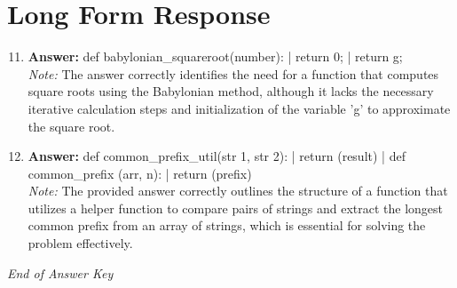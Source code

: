 \documentclass[12pt]{article}
\begin{document}
\section*{Long Form Response}
\begin{enumerate}[label=\arabic*.]
\setcounter{enumi}{10}
\item \textbf{Answer:} def babylonian\_squareroot(number): | return 0; | return g;
\\ \textit{Note:} The answer correctly identifies the need for a function that computes square roots using the Babylonian method, although it lacks the necessary iterative calculation steps and initialization of the variable 'g' to approximate the square root.
\item \textbf{Answer:} def common\_prefix\_util(str 1, str 2): | return (result) | def common\_prefix (arr, n): | return (prefix)
\\ \textit{Note:} The provided answer correctly outlines the structure of a function that utilizes a helper function to compare pairs of strings and extract the longest common prefix from an array of strings, which is essential for solving the problem effectively.
\end{enumerate}

\vfill
\noindent\textit{End of Answer Key}
\end{document}

